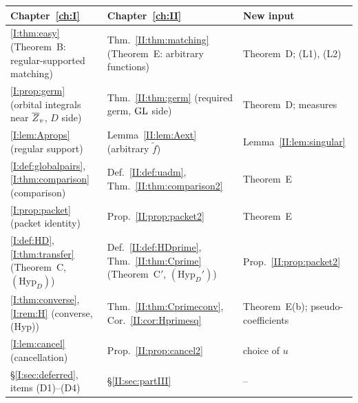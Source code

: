 \begin{center}
\begin{tabular}{>{\raggedright\arraybackslash}p{}>{\raggedright\arraybackslash}p{}>{\raggedright\arraybackslash}p{}}
\toprule
Chapter~\ref{ch:I} & Chapter~\ref{ch:II} & New input\\
\midrule
\cref{I:thm:easy} (Theorem~B: regular-supported matching) & Thm.~\ref{II:thm:matching} (Theorem~E: arbitrary functions) & Theorem~D; (L1), (L2)\\
\cref{I:prop:germ} (orbital integrals near $\overline{Z}_v$, $D$ side) & Thm.~\ref{II:thm:germ} (required germ, $\mathrm{GL}$ side) & Theorem~D; measures\\
\cref{I:lem:Aprops} (regular support) & Lemma~\ref{II:lem:Aext} (arbitrary $\tilde f$) & Lemma~\ref{II:lem:singular}\\
\cref{I:def:globalpairs}, \cref{I:thm:comparison} (comparison) & Def.~\ref{II:def:uadm}, Thm.~\ref{II:thm:comparison2} & Theorem~E\\
\cref{I:prop:packet} (packet identity) & Prop.~\ref{II:prop:packet2} & Theorem~E\\
\cref{I:def:HD}, \cref{I:thm:transfer} (Theorem~C, $(\mathrm{Hyp}_D)$) & Def.~\ref{II:def:HDprime}, Thm.~\ref{II:thm:Cprime} (Theorem~C$'$, $(\mathrm{Hyp}_D')$) & Prop.~\ref{II:prop:packet2}\\
\cref{I:thm:converse}, \cref{I:rem:H} (converse, (Hyp)) & Thm.~\ref{II:thm:Cprimeconv}, Cor.~\ref{II:cor:Hprimesq} & Theorem~E(b); pseudo-coefficients\\
\cref{I:lem:cancel} (cancellation) & Prop.~\ref{II:prop:cancel2} & choice of $u$\\
\S\ref{I:sec:deferred}, items (D1)--(D4) & \S\ref{II:sec:partIII} & --\\
\bottomrule
\end{tabular}
\end{center}

